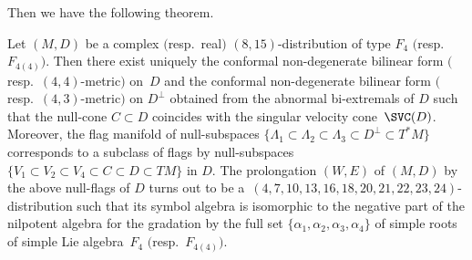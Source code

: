 Then we have the following theorem.

\begin{Theorem}\label{Main-Theorem}
 Let $(M, D)$ be a complex $($resp.\ real$)$ $(8, 15)$-distribution of type $F_4$ $($resp.\ $F_{4(4)})$.
Then there exist uniquely the conformal non-degenerate bilinear form $($resp.\ $(4, 4)$-metric$)$ on~$D$ and the conformal non-degenerate bilinear form $($resp.\ $(4, 3)$-metric$)$ on $D^\perp$ obtained from the abnormal bi-extremals of $D$
such that the null-cone $C \subset D$ coincides with the singular velocity cone~$\SVC(D)$.
Moreover, the flag manifold of null-subspaces
${\bigl\{ \Lambda_1 \subset \Lambda_2 \subset \Lambda_3 \subset D^\perp \subset T^*M\bigr\}}$
corresponds to a subclass of flags by null-subspaces ${\{ V_1 \subset V_2 \subset V_4 \subset C \subset D \subset TM\}}$ in $D$. The prolongation $(W, E)$ of $(M, D)$ by the above null-flags of $D$
turns out to be a~$(4,7,10,13,16,18,20,\allowbreak 21,22,23,24)$-distribution such that its symbol algebra
is isomorphic to the negative part of the nilpotent algebra for the gradation by the full set
$\{\alpha_1, \alpha_2, \alpha_3, \alpha_4\}$ of simple roots
of simple Lie algebra~$F_4$ $($resp.\ $F_{4(4)})$.
\end{Theorem}

